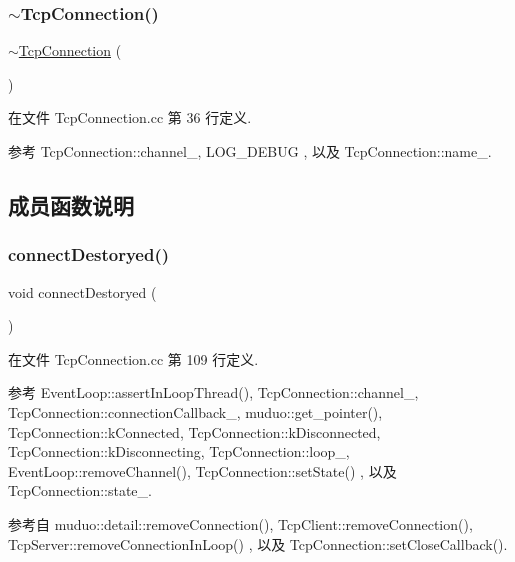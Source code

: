 \subsubsection{\texorpdfstring{$\sim$\+Tcp\+Connection()}{~TcpConnection()}}
{\footnotesize\ttfamily $\sim$\hyperlink{classmuduo_1_1TcpConnection}{Tcp\+Connection} (\begin{DoxyParamCaption}{ }\end{DoxyParamCaption})}



在文件 Tcp\+Connection.\+cc 第 36 行定义.



参考 Tcp\+Connection\+::channel\+\_\+, L\+O\+G\+\_\+\+D\+E\+B\+UG , 以及 Tcp\+Connection\+::name\+\_\+.



\subsection{成员函数说明}
\mbox{\label{classmuduo_1_1TcpConnection_afff2c1576d605dda12f87d2b32d5c1a2}} 
\subsubsection{\texorpdfstring{connect\+Destoryed()}{connectDestoryed()}}
{\footnotesize\ttfamily void connect\+Destoryed (\begin{DoxyParamCaption}{ }\end{DoxyParamCaption})}



在文件 Tcp\+Connection.\+cc 第 109 行定义.



参考 Event\+Loop\+::assert\+In\+Loop\+Thread(), Tcp\+Connection\+::channel\+\_\+, Tcp\+Connection\+::connection\+Callback\+\_\+, muduo\+::get\+\_\+pointer(), Tcp\+Connection\+::k\+Connected, Tcp\+Connection\+::k\+Disconnected, Tcp\+Connection\+::k\+Disconnecting, Tcp\+Connection\+::loop\+\_\+, Event\+Loop\+::remove\+Channel(), Tcp\+Connection\+::set\+State() , 以及 Tcp\+Connection\+::state\+\_\+.



参考自 muduo\+::detail\+::remove\+Connection(), Tcp\+Client\+::remove\+Connection(), Tcp\+Server\+::remove\+Connection\+In\+Loop() , 以及 Tcp\+Connection\+::set\+Close\+Callback().

